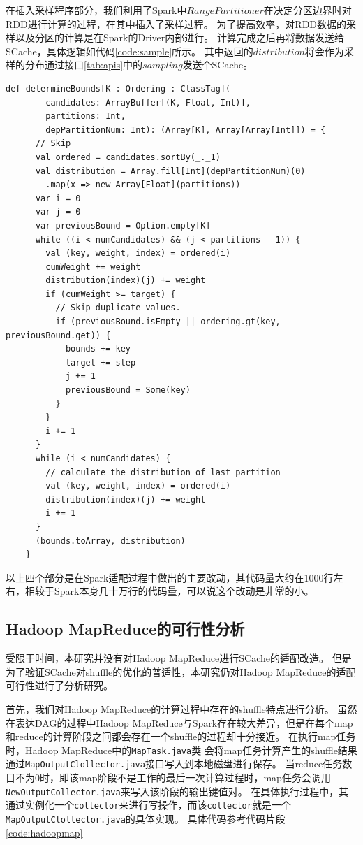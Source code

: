 在插入采样程序部分，我们利用了Spark中$RangePartitioner$在决定分区边界时对RDD进行计算的过程，在其中插入了采样过程。
为了提高效率，对RDD数据的采样以及分区的计算是在Spark的Driver内部进行。
计算完成之后再将数据发送给SCache，具体逻辑如代码\ref{code:sample}所示。
其中返回的$distribution$将会作为采样的分布通过接口\ref{tab:apis}中的$sampling$发送个SCache。

\begin{lstlisting}[style={myScalastyle}, caption={水塘采样代码片段}, label={code:sample}]
    def determineBounds[K : Ordering : ClassTag](
        candidates: ArrayBuffer[(K, Float, Int)],
        partitions: Int,
        depPartitionNum: Int): (Array[K], Array[Array[Int]]) = {
      // Skip
      val ordered = candidates.sortBy(_._1)
      val distribution = Array.fill[Int](depPartitionNum)(0)
        .map(x => new Array[Float](partitions))
      var i = 0
      var j = 0
      var previousBound = Option.empty[K]
      while ((i < numCandidates) && (j < partitions - 1)) {
        val (key, weight, index) = ordered(i)
        cumWeight += weight
        distribution(index)(j) += weight
        if (cumWeight >= target) {
          // Skip duplicate values.
          if (previousBound.isEmpty || ordering.gt(key, previousBound.get)) {
            bounds += key
            target += step
            j += 1
            previousBound = Some(key)
          }
        }
        i += 1
      }
      while (i < numCandidates) {
        // calculate the distribution of last partition
        val (key, weight, index) = ordered(i)
        distribution(index)(j) += weight
        i += 1
      }
      (bounds.toArray, distribution)
    }
\end{lstlisting}

以上四个部分是在Spark适配过程中做出的主要改动，其代码量大约在1000行左右，相较于Spark本身几十万行的代码量，可以说这个改动是非常的小。

\subsection{Hadoop MapReduce的可行性分析}

受限于时间，本研究并没有对Hadoop MapReduce进行SCache的适配改造。
但是为了验证SCache对shuffle的优化的普适性，本研究仍对Hadoop MapReduce的适配可行性进行了分析研究。

首先，我们对Hadoop MapReduce的计算过程中存在的shuffle特点进行分析。
虽然在表达DAG的过程中Hadoop MapReduce与Spark存在较大差异，但是在每个map和reduce的计算阶段之间都会存在一个shuffle的过程却十分接近。
在执行map任务时，Hadoop MapReduce中的\verb|MapTask.java|类
会将map任务计算产生的shuffle结果通过\verb|MapOutputClollector.java|接口写入到本地磁盘进行保存。
当reduce任务数目不为0时，即该map阶段不是工作的最后一次计算过程时，map任务会调用\verb|NewOutputCollector.java|来写入该阶段的输出键值对。
在具体执行过程中，其通过实例化一个\verb|collector|来进行写操作，而该\verb|collector|就是一个\verb|MapOutputClollector.java|的具体实现。
具体代码参考代码片段\ref{code:hadoopmap}

